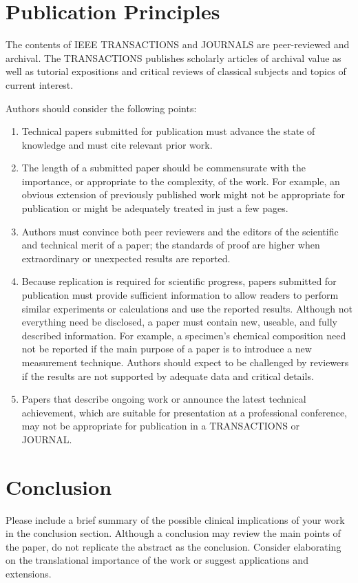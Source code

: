 \documentclass[transmag, onecolumn]{IEEEtran}
\begin{document}
\section{Publication Principles}
The contents of IEEE TRANSACTIONS and JOURNALS are peer-reviewed and 
archival. The TRANSACTIONS publishes scholarly articles of archival value as 
well as tutorial expositions and critical reviews of classical subjects and 
topics of current interest. 

Authors should consider the following points:

\begin{enumerate}
\item Technical papers submitted for publication must advance the state of knowledge and must cite relevant prior work. 
\item The length of a submitted paper should be commensurate with the importance, or appropriate to the complexity, of the work. For example, an obvious extension of previously published work might not be appropriate for publication or might be adequately treated in just a few pages.
\item Authors must convince both peer reviewers and the editors of the scientific and technical merit of a paper; the standards of proof are higher when extraordinary or unexpected results are reported. 
\item Because replication is required for scientific progress, papers submitted for publication must provide sufficient information to allow readers to perform similar experiments or calculations and use the reported results. Although not everything need be disclosed, a paper must contain new, useable, and fully described information. For example, a specimen's chemical composition need not be reported if the main purpose of a paper is to introduce a new measurement technique. Authors should expect to be challenged by reviewers if the results are not supported by adequate data and critical details.
\item Papers that describe ongoing work or announce the latest technical achievement, which are suitable for presentation at a professional conference, may not be appropriate for publication in a TRANSACTIONS or JOURNAL.
\end{enumerate}

\section{Conclusion}
Please include a brief summary of the possible clinical implications of your 
work in the conclusion section. Although a conclusion may review the main 
points of the paper, do not replicate the abstract as the conclusion. 
Consider elaborating on the translational importance of the work or suggest 
applications and extensions. 
\end{document}
